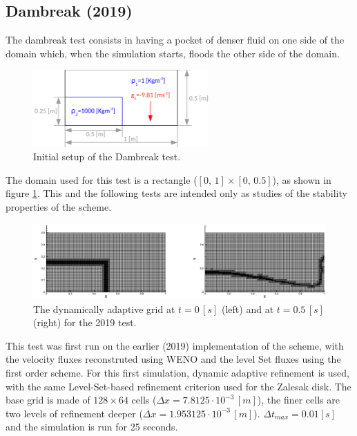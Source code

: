 \documentclass[11pt, a4paper, oneside, openany]{book}
\begin{document}
\subsection{Dambreak (2019)}\label{Section_Dambreak_2019}
The dambreak test consists in having a pocket of denser fluid on one side of the domain which, when the simulation starts, floods the other side of the domain.\par
\begin{figure}[!ht]
	\centering
	\includegraphics[width=0.6\textwidth]{Dambreak_setup.pdf}
	\caption[Dambreak Test Setup]{Initial setup of the Dambreak test.}\label{DambreakSetup}
\end{figure}\noindent
The domain used for this test is a rectangle ($\left[0,\,1\right]\times\left[0,\,0.5\right]$), as shown in figure \ref{DambreakSetup}. This and the following tests are intended only as studies of the stability properties of the scheme.\par
\begin{figure}[!ht]
	\centering
	\includegraphics[width=1\textwidth]{DambreakAMRMesh.eps}
	\caption[Dambreak AMR Grid]{The dynamically adaptive grid at $t = 0\,[s]$ (left) and at $t = 0.5\,[s]$ (right) for the 2019 test.}\label{Dambreak2019Grid}
\end{figure}\noindent
This test was first run on the earlier (2019) implementation of the scheme, with the velocity fluxes reconstruted using WENO and the level Set fluxes using the first order scheme. For this first simulation, dynamic adaptive refinement is used, with the same Level-Set-based refinement criterion used for the Zalesak disk. The base grid is made of $128\times 64$ cells ($\Delta x = 7.8125\cdot 10^{-3}\,[m]$), the finer cells are two levels of refinement deeper ($\Delta x = 1.953125\cdot 10^{-3}\,[m]$). $\Delta t_{max} = 0.01 [s]$ and the simulation is run for 25 seconds.\par
\end{document}
